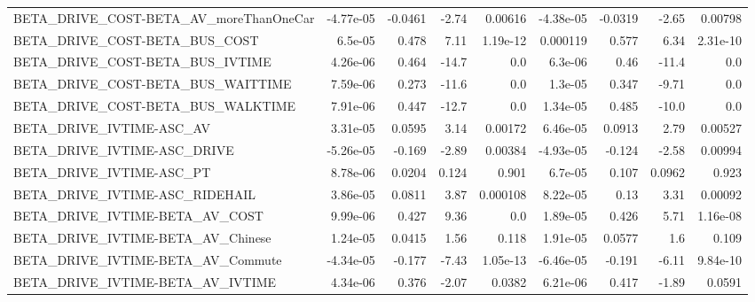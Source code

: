 \begin{tabular}{lrrrrrrrr}
BETA\_DRIVE\_COST-BETA\_AV\_moreThanOneCar             &   -4.77e-05 &      -0.0461 &     -2.74 &  0.00616 &  -4.38e-05 &     -0.0319 &        -2.65 &       0.00798 \\
BETA\_DRIVE\_COST-BETA\_BUS\_COST                      &     6.5e-05 &        0.478 &      7.11 & 1.19e-12 &   0.000119 &       0.577 &         6.34 &      2.31e-10 \\
BETA\_DRIVE\_COST-BETA\_BUS\_IVTIME                    &    4.26e-06 &        0.464 &     -14.7 &      0.0 &    6.3e-06 &        0.46 &        -11.4 &           0.0 \\
BETA\_DRIVE\_COST-BETA\_BUS\_WAITTIME                  &    7.59e-06 &        0.273 &     -11.6 &      0.0 &    1.3e-05 &       0.347 &        -9.71 &           0.0 \\
BETA\_DRIVE\_COST-BETA\_BUS\_WALKTIME                  &    7.91e-06 &        0.447 &     -12.7 &      0.0 &   1.34e-05 &       0.485 &        -10.0 &           0.0 \\
BETA\_DRIVE\_IVTIME-ASC\_AV                           &    3.31e-05 &       0.0595 &      3.14 &  0.00172 &   6.46e-05 &      0.0913 &         2.79 &       0.00527 \\
BETA\_DRIVE\_IVTIME-ASC\_DRIVE                        &   -5.26e-05 &       -0.169 &     -2.89 &  0.00384 &  -4.93e-05 &      -0.124 &        -2.58 &       0.00994 \\
BETA\_DRIVE\_IVTIME-ASC\_PT                           &    8.78e-06 &       0.0204 &     0.124 &    0.901 &    6.7e-05 &       0.107 &       0.0962 &         0.923 \\
BETA\_DRIVE\_IVTIME-ASC\_RIDEHAIL                     &    3.86e-05 &       0.0811 &      3.87 & 0.000108 &   8.22e-05 &        0.13 &         3.31 &       0.00092 \\
BETA\_DRIVE\_IVTIME-BETA\_AV\_COST                     &    9.99e-06 &        0.427 &      9.36 &      0.0 &   1.89e-05 &       0.426 &         5.71 &      1.16e-08 \\
BETA\_DRIVE\_IVTIME-BETA\_AV\_Chinese                  &    1.24e-05 &       0.0415 &      1.56 &    0.118 &   1.91e-05 &      0.0577 &          1.6 &         0.109 \\
BETA\_DRIVE\_IVTIME-BETA\_AV\_Commute                  &   -4.34e-05 &       -0.177 &     -7.43 & 1.05e-13 &  -6.46e-05 &      -0.191 &        -6.11 &      9.84e-10 \\
BETA\_DRIVE\_IVTIME-BETA\_AV\_IVTIME                   &    4.34e-06 &        0.376 &     -2.07 &   0.0382 &   6.21e-06 &       0.417 &        -1.89 &        0.0591 \\

\end{tabular}
